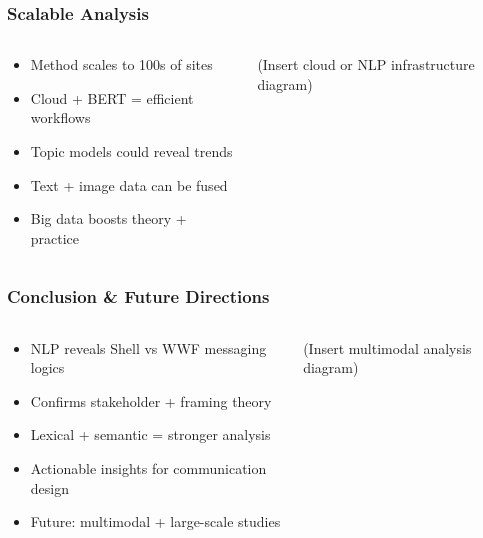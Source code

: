 \documentclass[aspectratio=1610]{beamer}
\begin{document}
\begin{frame}
  \frametitle{Scalable Analysis}
  \begin{columns}
    \begin{column}{0.6\textwidth}
      \begin{itemize}
        \item Method scales to 100s of sites
        \item Cloud + BERT = efficient workflows
        \item Topic models could reveal trends
        \item Text + image data can be fused
        \item Big data boosts theory + practice
      \end{itemize}
    \end{column}
    \begin{column}{0.4\textwidth}
      (Insert cloud or NLP infrastructure diagram)
    \end{column}
  \end{columns}
\end{frame}

\begin{frame}
  \frametitle{Conclusion \& Future Directions}
  \begin{columns}
    \begin{column}{0.6\textwidth}
      \begin{itemize}
        \item NLP reveals Shell vs WWF messaging logics
        \item Confirms stakeholder + framing theory
        \item Lexical + semantic = stronger analysis
        \item Actionable insights for communication design
        \item Future: multimodal + large-scale studies
      \end{itemize}
    \end{column}
    \begin{column}{0.4\textwidth}
      (Insert multimodal analysis diagram)
    \end{column}
  \end{columns}
\end{frame}
\end{document}
